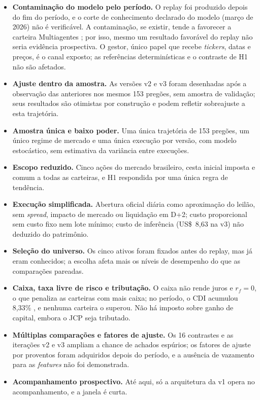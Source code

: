 \begin{itemize}
    \item \textbf{Contaminação do modelo pelo período.} O replay foi produzido depois do fim do período, e o corte de conhecimento declarado do modelo (março de 2026) não é verificável. A contaminação, se existir, tende a favorecer a carteira Multiagentes \citep{ProfitMirage2025, Wang2026}; por isso, mesmo um resultado favorável do replay não seria evidência prospectiva. O gestor, único papel que recebe \textit{tickers}, datas e preços, é o canal exposto; as referências determinísticas e o contraste de H1 não são afetados.
    \item \textbf{Ajuste dentro da amostra.} As versões v2 e v3 foram desenhadas após a observação das anteriores nos mesmos 153 pregões, sem amostra de validação; seus resultados são otimistas por construção e podem refletir sobreajuste a esta trajetória.
    \item \textbf{Amostra única e baixo poder.} Uma única trajetória de 153 pregões, um único regime de mercado e uma única execução por versão, com modelo estocástico, sem estimativa da variância entre execuções.
    \item \textbf{Escopo reduzido.} Cinco ações do mercado brasileiro, cesta inicial imposta e comum a todas as carteiras, e H1 respondida por uma única regra de tendência.
    \item \textbf{Execução simplificada.} Abertura oficial diária como aproximação do leilão, sem \textit{spread}, impacto de mercado ou liquidação em D+2; custo proporcional sem custo fixo nem lote mínimo; custo de inferência (US\$~8,63 na v3) não deduzido do patrimônio.
    \item \textbf{Seleção do universo.} Os cinco ativos foram fixados antes do replay, mas já eram conhecidos; a escolha afeta mais os níveis de desempenho do que as comparações pareadas.
    \item \textbf{Caixa, taxa livre de risco e tributação.} O caixa não rende juros e $r_f = 0$, o que penaliza as carteiras com mais caixa; no período, o CDI acumulou 8,33\% \citep{BCBCDI2026}, e nenhuma carteira o superou. Não há imposto sobre ganho de capital, embora o JCP seja tributado.
    \item \textbf{Múltiplas comparações e fatores de ajuste.} Os 16 contrastes e as iterações v2 e v3 ampliam a chance de achados espúrios; os fatores de ajuste por proventos foram adquiridos depois do período, e a ausência de vazamento para as \textit{features} não foi demonstrada.
    \item \textbf{Acompanhamento prospectivo.} Até aqui, só a arquitetura da v1 opera no acompanhamento, e a janela é curta.

\end{itemize}

